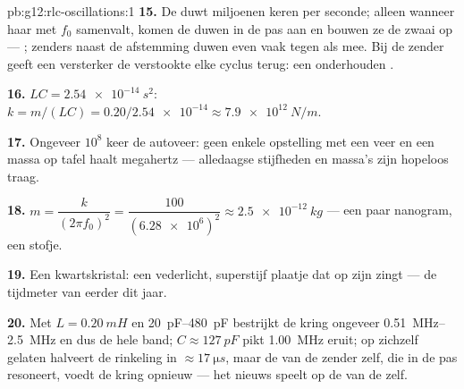 \begin{solution}{pb:g12:rlc-oscillations:1}
\textbf{15.} De  duwt miljoenen keren per seconde; alleen wanneer haar
 met $f_0$ samenvalt, komen de duwen in de pas aan en bouwen ze de
zwaai op --- ; zenders naast de afstemming duwen even vaak tegen als
mee. Bij de zender geeft een versterker de verstookte  elke cyclus
terug: een onderhouden .

\textbf{16.} $LC = \qty{2.54e-14}{s^2}$: $k = m/(LC) =
0.20/\num{2.54e-14} \approx \qty{7.9e12}{N/m}$.

\textbf{17.} Ongeveer $10^8$ keer de autoveer: geen enkele opstelling met een
veer en een massa op tafel haalt megahertz --- alledaagse stijfheden en massa's
zijn hopeloos traag.

\textbf{18.} $m = \dfrac{k}{(2\pi f_0)^2} = \dfrac{100}
{(\num{6.28e6})^2} \approx \qty{2.5e-12}{kg}$ --- een paar nanogram, een
stofje.

\textbf{19.} Een kwartskristal: een vederlicht, superstijf plaatje dat op zijn
 zingt --- de tijdmeter van eerder dit jaar.

\textbf{20.} Met $L = \qty{0.20}{mH}$ en \qtyrange{20}{480}{pF} bestrijkt de
kring ongeveer \qtyrange{0.51}{2.5}{MHz} en dus de hele band;
$C \approx \qty{127}{pF}$ pikt \qty{1.00}{MHz} eruit; op zichzelf gelaten
halveert de rinkeling in $\approx \qty{17}{\micro s}$, maar de  van de
zender zelf, die in de pas resoneert, voedt de kring opnieuw --- het nieuws
speelt op de  van de  zelf.
\end{solution}
